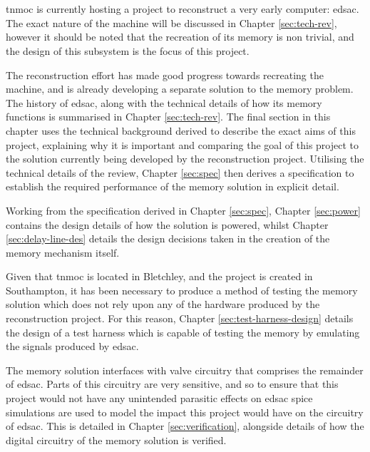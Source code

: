 
\chapter{} \label{sec:intro}
\gls{tnmoc} is currently hosting a project to reconstruct a very early computer: \gls{edsac}. The exact nature of the machine will be discussed in Chapter \ref{sec:tech-rev}, however it should be noted that the recreation of its memory is non trivial, and the design of this subsystem is the focus of this project.

The reconstruction effort has made good progress towards recreating the machine, and is already developing a separate solution to the memory problem. The history of \gls{edsac}, along with the technical details of how its memory functions is summarised in Chapter \ref{sec:tech-rev}. The final section in this chapter uses the technical background derived to describe the exact aims of this project, explaining why it is important and comparing the goal of this project to the solution currently being developed by the reconstruction project. Utilising the technical details of the review, Chapter \ref{sec:spec} then derives a specification to establish the required performance of the memory solution in explicit detail.

Working from the specification derived in Chapter \ref{sec:spec}, Chapter \ref{sec:power} contains the design details of how the solution is powered, whilst Chapter \ref{sec:delay-line-des} details the design decisions taken in the creation of the memory mechanism itself.

Given that \gls{tnmoc} is located in Bletchley, and the project is created in Southampton, it has been necessary to produce a method of testing the memory solution which does not rely upon any of the hardware produced by the reconstruction project. For this reason, Chapter \ref{sec:test-harness-design} details the design of a test harness which is capable of testing the memory by emulating the signals produced by \gls{edsac}.

The memory solution interfaces with valve circuitry that comprises the remainder of \gls{edsac}. Parts of this circuitry are very sensitive, and so to ensure that this project would not have any unintended parasitic effects on \gls{edsac} \gls{spice} simulations are used to model the impact this project would have on the circuitry of \gls{edsac}. This is detailed in Chapter \ref{sec:verification}, alongside details of how the digital circuitry of the memory solution is verified.

